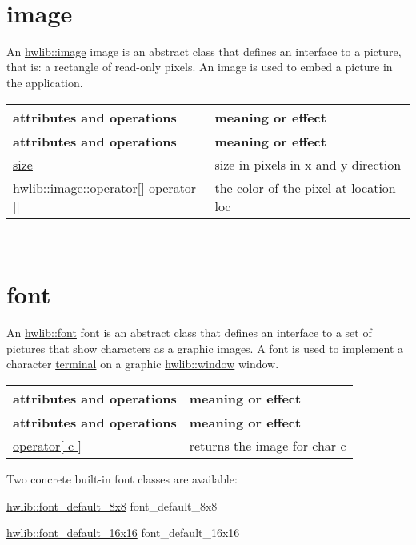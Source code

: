 ~\newline
 

\hypertarget{graphics_image}{}\section{image}\label{graphics_image}
An \hyperlink{classhwlib_1_1image}{hwlib\+::image} image is an abstract class that defines an interface to a picture, that is\+: a rectangle of read-\/only pixels. An image is used to embed a picture in the application.

\tabulinesep=1mm
\begin{longtabu} spread 0pt [c]{*{2}{|X[-1]}|}
\hline
\rowcolor{\tableheadbgcolor}\textbf{ attributes and operations }&\textbf{ meaning or effect  }\\
\endfirsthead
\hline
\endfoot
\hline
\rowcolor{\tableheadbgcolor}\textbf{ attributes and operations }&\textbf{ meaning or effect  }\\
\endhead
\hyperlink{classhwlib_1_1image_af98b91ebc4718e987918dae845691296}{size} &size in pixels in x and y direction \\
\hyperlink{classhwlib_1_1image_a03e601777443a100803fdb3b185231ee}{hwlib\+::image\+::operator\mbox{[}\mbox{]}} operator \mbox{[}\mbox{]} &the color of the pixel at location loc \\
\end{longtabu}
~\newline
 

\hypertarget{graphics_font}{}\section{font}\label{graphics_font}
An \hyperlink{classhwlib_1_1font}{hwlib\+::font} font is an abstract class that defines an interface to a set of pictures that show characters as a graphic images. A font is used to implement a character \hyperlink{classhwlib_1_1terminal}{terminal} on a graphic \hyperlink{classhwlib_1_1window}{hwlib\+::window} window.

\tabulinesep=1mm
\begin{longtabu} spread 0pt [c]{*{2}{|X[-1]}|}
\hline
\rowcolor{\tableheadbgcolor}\textbf{ attributes and operations }&\textbf{ meaning or effect  }\\
\endfirsthead
\hline
\endfoot
\hline
\rowcolor{\tableheadbgcolor}\textbf{ attributes and operations }&\textbf{ meaning or effect  }\\
\endhead
\hyperlink{classhwlib_1_1image_a03e601777443a100803fdb3b185231ee}{operator\mbox{[} c \mbox{]}} &returns the image for char c \\
\end{longtabu}
Two concrete built-\/in font classes are available\+:
\begin{DoxyItemize}
\item \hyperlink{classhwlib_1_1font__default__8x8}{hwlib\+::font\+\_\+default\+\_\+8x8} font\+\_\+default\+\_\+8x8
\item \hyperlink{classhwlib_1_1font__default__16x16}{hwlib\+::font\+\_\+default\+\_\+16x16} font\+\_\+default\+\_\+16x16
\end{DoxyItemize}

